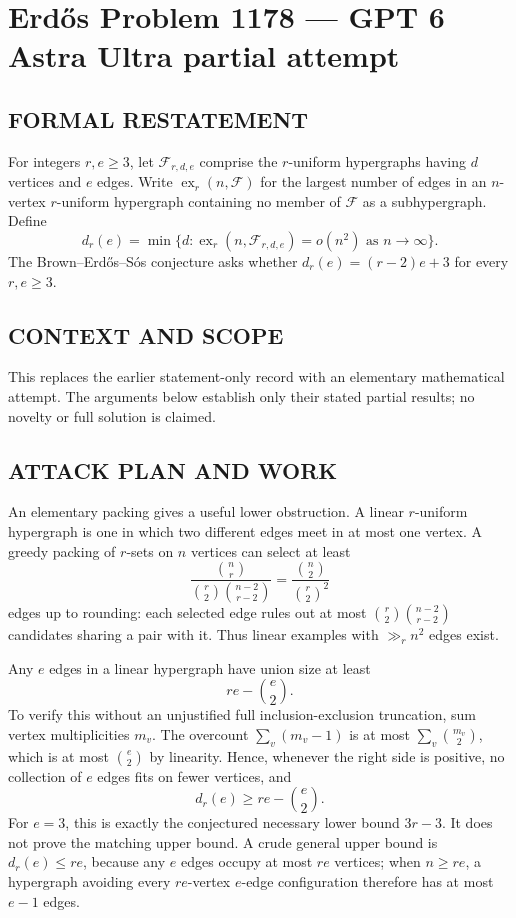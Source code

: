 \section*{Erd\H{o}s Problem 1178 --- GPT 6 Astra Ultra partial attempt}


\subsection*{FORMAL RESTATEMENT}
For integers $r,e\geq3$, let $\mathcal F_{r,d,e}$ comprise the $r$-uniform hypergraphs having $d$ vertices and $e$ edges. Write $\operatorname{ex}_r(n,\mathcal F)$ for the largest number of edges in an $n$-vertex $r$-uniform hypergraph containing no member of $\mathcal F$ as a subhypergraph. Define
\[d_r(e)=\min\{d:\operatorname{ex}_r(n,\mathcal F_{r,d,e})=o(n^2)\text{ as }n\to\infty\}.\]
The Brown--Erd\H{o}s--S\'os conjecture asks whether $d_r(e)=(r-2)e+3$ for every $r,e\geq3$.

\subsection*{CONTEXT AND SCOPE}
This replaces the earlier statement-only record with an elementary mathematical attempt. The arguments below establish only their stated partial results; no novelty or full solution is claimed.

\subsection*{ATTACK PLAN AND WORK}
An elementary packing gives a useful lower obstruction. A linear $r$-uniform
hypergraph is one in which two different edges meet in at most one vertex.
A greedy packing of $r$-sets on $n$ vertices can select at least
\[\frac{\binom nr}{\binom r2\binom{n-2}{r-2}}
=\frac{\binom n2}{\binom r2^2}\]
edges up to rounding: each selected edge rules out at most
$\binom r2\binom{n-2}{r-2}$ candidates sharing a pair with it.
Thus linear examples with $\gg_r n^2$ edges exist.

Any $e$ edges in a linear hypergraph have union size at least
\[re-\binom e2.\tag{1}\]
To verify this without an unjustified full inclusion-exclusion truncation,
sum vertex multiplicities $m_v$. The overcount $\sum_v(m_v-1)$ is at most
$\sum_v\binom{m_v}{2}$, which is at most $\binom e2$ by linearity.
Hence, whenever the right side is positive, no collection of $e$ edges fits
on fewer vertices, and
\[d_r(e)\ge re-\binom e2.\tag{2}\]
For $e=3$, this is exactly the conjectured necessary lower bound $3r-3$.
It does not prove the matching upper bound. A crude general upper bound is
$d_r(e)\le re$, because any $e$ edges occupy at most $re$ vertices; when
$n\ge re$, a hypergraph avoiding every $re$-vertex $e$-edge configuration
therefore has at most $e-1$ edges.

